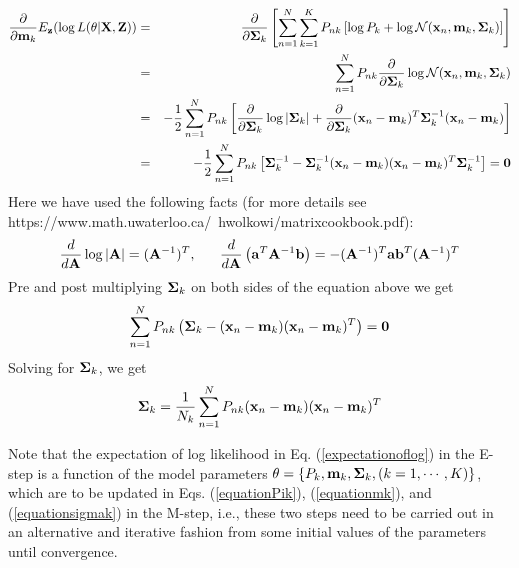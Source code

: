 \documentclass{article}
\begin{document}
\begin{itemize}
\begin{itemize}
    \begin{eqnarray}
      \frac{\partial}{\partial{\bf m}_k} E_{\bf z}(\log L(\theta|{\bf X},{\bf Z}))
      &=&\frac{\partial}{\partial{\bf\Sigma}_k} 
      \left[\sum_{n=1}^N \sum_{k=1}^K P_{nk}
        \left[\log P_k+\log {\cal N}({\bf x}_n,{\bf m}_k,{\bf\Sigma}_k)\right]\right]
      \nonumber\\
      &=&\sum_{n=1}^N P_{nk}\frac{\partial}{\partial{\bf\Sigma}_k} 
      \log {\cal N}({\bf x}_n,{\bf m}_k,{\bf\Sigma}_k)
      \nonumber\\
      &=&-\frac{1}{2}\sum_{n=1}^N P_{nk}
      \left[\frac{\partial}{\partial{\bf\Sigma}_k}\log|{\bf\Sigma}_k|
        +\frac{\partial}{\partial{\bf\Sigma}_k}({\bf x}_n-{\bf m}_k)^T{\bf\Sigma}_k^{-1}({\bf x}_n-{\bf m}_k)\right]
      \nonumber\\
      &=&-\frac{1}{2}\sum_{n=1}^N P_{nk}
      \left[{\bf\Sigma}_k^{-1}-{\bf\Sigma}_k^{-1}
        ({\bf x}_n-{\bf m}_k)({\bf x}_n-{\bf m}_k)^T{\bf\Sigma}_k^{-1}\right]={\bf 0}
      \label{equationsigmak}
    \end{eqnarray}
    Here we have used the following facts
    (for more details see 
    {https://www.math.uwaterloo.ca/~hwolkowi/matrixcookbook.pdf}):
    \begin{equation}
    \frac{d}{d{\bf A}}\log|{\bf A}|=({\bf A}^{-1})^T,
    \;\;\;\;\;\;
    \frac{d}{d{\bf A}} \left({\bf a}^T{\bf A}^{-1}{\bf b}\right)
    =-({\bf A}^{-1})^T{\bf a}{\bf b}^T({\bf A}^{-1})^T
    \end{equation}
    Pre and post multiplying ${\bf\Sigma}_k$ on both sides of the equation above
    we get
    \begin{equation}
      \sum_{n=1}^N P_{nk}\left({\bf\Sigma}_k-({\bf x}_n-{\bf m}_k)({\bf x}_n-{\bf m}_k)^T\right)={\bf 0}
    \end{equation}
    Solving for ${\bf\Sigma}_k$, we get
    \begin{equation}
      {\bf\Sigma}_k=\frac{1}{N_k}\sum_{n=1}^N P_{nk}({\bf x}_n-{\bf m}_k)({\bf x}_n-{\bf m}_k)^T
    \end{equation}

  \end{itemize}
\end{itemize}
Note that the expectation of log likelihood in Eq. (\ref{expectationoflog})
in the E-step is a function of the model parameters 
${\bf\theta}=\{P_k,{\bf m}_k,{\bf\Sigma}_k,(k=1,\cdots,K)\}$, which 
are to be updated in Eqs. (\ref{equationPik}), (\ref{equationmk}), and
(\ref{equationsigmak}) in the M-step, i.e., these two steps need to be
carried out in an alternative and iterative fashion from some initial
values of the parameters until convergence.
\end{document}
